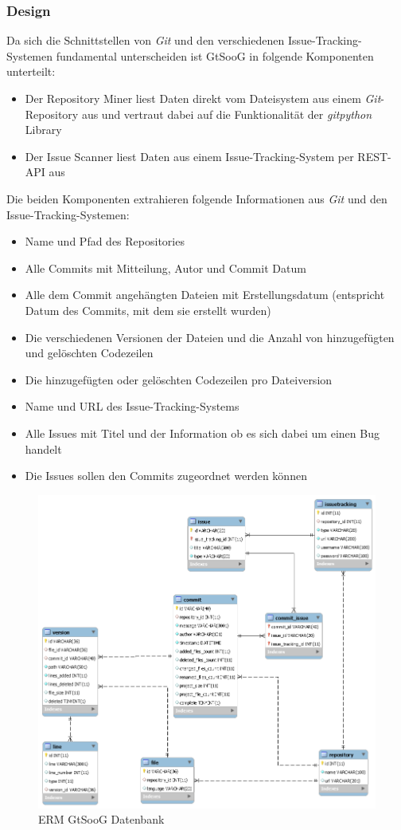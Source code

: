 \documentclass[10pt, a4paper]{article}
\begin{document}
\subsubsection{Design}
Da sich die Schnittstellen von \emph{Git} und den verschiedenen Is\-sue-Track\-ing-Sys\-tem\-en fundamental unterscheiden ist GtSooG in folgende Komponenten unterteilt:
\begin{itemize}
	\item Der Repository Miner liest Daten direkt vom Dateisystem aus einem \emph{Git}-Repository aus und vertraut dabei auf die Funktionalität der \emph{gitpython} Library
	\item Der Issue Scanner liest Daten aus einem Issue-Tracking-System per \acs{REST}-\acs{API} aus
\end{itemize}
Die beiden Komponenten extrahieren folgende Informationen aus \emph{Git} und den Issue-Tracking-Systemen:
\begin{itemize}
	\item Name und Pfad des Repositories
	\item Alle Commits mit Mitteilung, Autor und Commit Datum
	\item Alle dem Commit angehängten Dateien mit Erstellungsdatum (entspricht Datum des Commits, mit dem sie erstellt wurden)
	\item Die verschiedenen Versionen der Dateien und die Anzahl von hinzugefügten und gelöschten Codezeilen
	\item Die hinzugefügten oder gelöschten Codezeilen pro Dateiversion
	\item Name und URL des Issue-Tracking-Systems
	\item Alle Issues mit Titel und der Information ob es sich dabei um einen Bug handelt
	\item Die Issues sollen den Commits zugeordnet werden können
\end{itemize}
\begin{figure}[!ht]
	\centering
	\includegraphics[width=1\textwidth]{resources/images/db_reverse_engineered_gtsoog.png}
	\caption{ERM GtSooG Datenbank}
	\label{fig:DBDesignGtSooG}
\end{figure}
\end{document}
